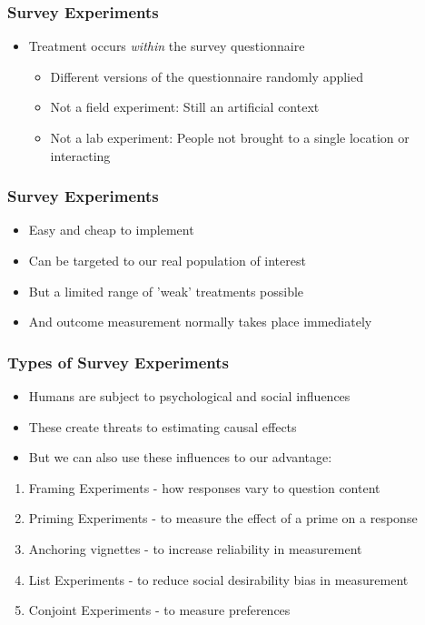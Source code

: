 \documentclass[xcolor=x11names,compress]{beamer}\usepackage[]{graphicx}\usepackage[]{color}
\renewcommand{\(}{\begin{columns}}
\renewcommand{\)}{\end{columns}}
\newcommand{\<}[1]{\begin{column}{#1}}
\renewcommand{\>}{\end{column}}
\begin{document}
\begin{frame}
\frametitle{Survey Experiments}
\begin{itemize}
\item Treatment occurs \textit{within} the survey questionnaire
\pause
\begin{itemize}
\item Different versions of the questionnaire randomly applied
\pause
\item Not a field experiment: Still an artificial context
\pause
\item Not a lab experiment: People not brought to a single location or interacting
\end{itemize}
\end{itemize}
\end{frame}

\begin{frame}
\frametitle{Survey Experiments}
\begin{itemize}
\item Easy and cheap to implement
\pause
\item Can be targeted to our real population of interest
\pause
\item But a limited range of 'weak' treatments possible
\pause
\item And outcome measurement normally takes place immediately
\end{itemize}
\end{frame}

\begin{frame}
\frametitle{Types of Survey Experiments}
\begin{itemize}
\item Humans are subject to psychological and social influences
\pause
\item These create threats to estimating causal effects
\pause
\item But we can also use these influences to our advantage:
\pause
\end{itemize}
\begin{enumerate}
\item Framing Experiments - how responses vary to question content
\pause
\item Priming Experiments - to measure the effect of a prime on a response
\pause
\item Anchoring vignettes - to increase reliability in measurement
\pause
\item List Experiments - to reduce social desirability bias in measurement
\pause
\item Conjoint Experiments - to measure preferences
\end{enumerate}
\end{frame}
\end{document}
